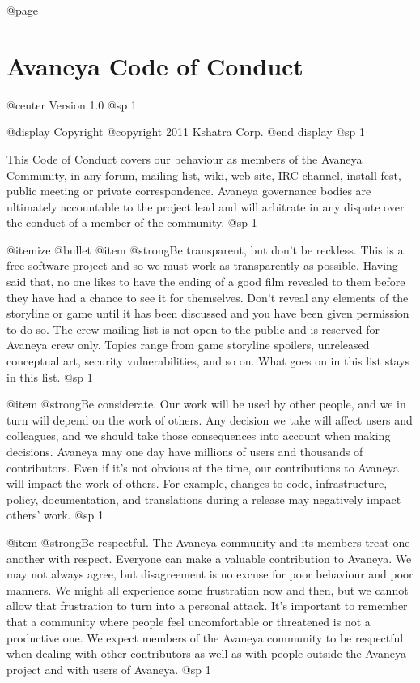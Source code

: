 @page
\section{Avaneya Code of Conduct}
@center Version 1.0
@sp 1


@display
Copyright @copyright{} 2011 Kshatra Corp.
@end display
@sp 1

This Code of Conduct covers our behaviour as members of the Avaneya
Community, in any forum, mailing list, wiki, web site, IRC channel,
install-fest, public meeting or private correspondence. Avaneya
governance bodies are ultimately accountable to the project lead and
will arbitrate in any dispute over the conduct of a member of the
community.
@sp 1

@itemize @bullet
@item
@strong{Be transparent, but don't be reckless.} This is a free
software project and so we must work as transparently as possible.
Having said that, no one likes to have the ending of a good film
revealed to them before they have had a chance to see it for
themselves. Don't reveal any elements of the storyline or game until
it has been discussed and you have been given permission to do so. The
crew mailing list is not open to the public and is reserved for
Avaneya crew only. Topics range from game storyline spoilers,
unreleased conceptual art, security vulnerabilities, and so on. What
goes on in this list stays in this list.
@sp 1

@item
@strong{Be considerate.} Our work will be used by other people, and we
in turn will depend on the work of others. Any decision we take will
affect users and colleagues, and we should take those consequences
into account when making decisions. Avaneya may one day have millions
of users and thousands of contributors. Even if it's not obvious at
the time, our contributions to Avaneya will impact the work of others.
For example, changes to code, infrastructure, policy, documentation,
and translations during a release may negatively impact others' work.
@sp 1

@item
@strong{Be respectful.} The Avaneya community and its members treat one
another with respect. Everyone can make a valuable contribution to
Avaneya. We may not always agree, but disagreement is no excuse for
poor behaviour and poor manners. We might all experience some
frustration now and then, but we cannot allow that frustration to turn
into a personal attack. It's important to remember that a community
where people feel uncomfortable or threatened is not a productive one.
We expect members of the Avaneya community to be respectful when
dealing with other contributors as well as with people outside the
Avaneya project and with users of Avaneya.
@sp 1

